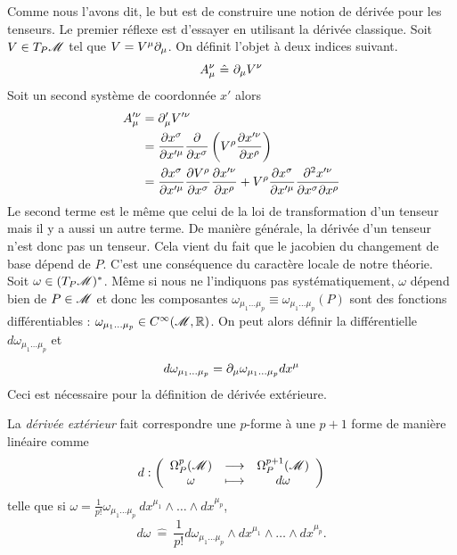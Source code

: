 \documentclass[a4paper,11pt]{report}
\begin{document}
            Comme nous l'avons dit, le but est de construire une notion de dérivée pour les tenseurs. Le premier réflexe est d'essayer en utilisant la dérivée classique. Soit $V\in T_P\mathscr{M}$ tel que $V = V^\mu \partial_\mu$. On définit l'objet à deux indices suivant.
            \begin{equation}
                A_\mu^\nu ~\hat{=}~ \partial_\mu V^\nu
            \end{equation}
            Soit un second système de coordonnée $x'$ alors 
            \begin{align}
                A'^\nu_\mu &= \partial'_\mu V'^\nu \\
                &= \pdv{x^\sigma}{x'^\mu}\pdv{}{x^\sigma}\left( V^\rho \pdv{x'^\nu}{x^\rho} \right)\\
                &= \pdv{x^\sigma}{x'^\mu}\pdv{V^\rho}{x^\sigma}\pdv{x'^\nu}{x^\rho}+V^\rho\pdv{x^\sigma}{x'^\mu}  \pdv{x'^\nu}{x^\sigma}{x^\rho}
            \end{align}
            Le second terme est le même que celui de la loi de transformation d'un tenseur mais il y a aussi un autre terme. De manière générale, la dérivée d'un tenseur n'est donc pas un tenseur. Cela vient du fait que le jacobien du changement de base dépend de $P$. C'est une conséquence du caractère locale de notre théorie.\\
            
            Soit $\omega\in (T_P\mathscr{M})^*$. Même si nous ne l'indiquons pas systématiquement, $\omega$ dépend bien de $P\in\mathscr{M}$ et donc les composantes $\omega_{\mu_1\dots\mu_p}\equiv \omega_{\mu_1\dots\mu_p}(P)$ sont des fonctions différentiables : $\omega_{\mu_1\dots\mu_p}\in C^{\infty}(\mathscr{M},\mathbb{R})$. On peut alors définir la différentielle $d\omega_{\mu_1\dots\mu_p}$ et
            \begin{equation}\label{eq:propdiffomega}
                d\omega_{\mu_1\dots\mu_p} = \partial_\mu \omega_{\mu_1\dots\mu_p}dx^\mu
            \end{equation}
            Ceci est nécessaire pour la définition de dérivée extérieure.
            
            \begin{defn}
                La \textit{dérivée extérieur} fait correspondre une $p$-forme à une $p+1$ forme de manière linéaire comme
                \begin{equation}
                d:\left(
                \begin{array}{ccc}
                    \Omega_P^p(\mathscr{M}) & \longrightarrow & \Omega_P^{p+1}(\mathscr{M}) \\
                    \omega & \longmapsto & d\omega
                \end{array}
                \right)
                \end{equation}
                telle que si $\omega = \frac{1}{p!}\omega_{\mu_1\dots\mu_p}~dx^{\mu_1}\wedge \dots\wedge dx^{\mu_p}$,
                \begin{equation}
                    d\omega ~\hat{=}~ \frac{1}{p!} d\omega_{\mu_1\dots\mu_p}\wedge dx^{\mu_1}\wedge \dots\wedge dx^{\mu_p}.
                \end{equation}
            \end{defn}
            
\end{document}
